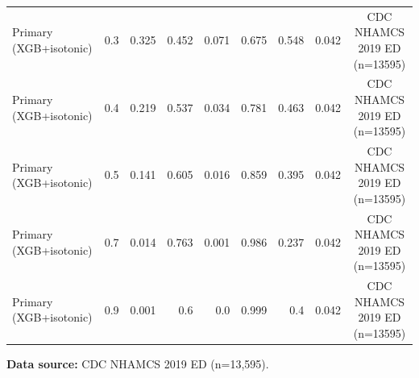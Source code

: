 \begin{table}[t]
\begin{tabular}{lrrrrrrrc}
Primary (XGB+isotonic) & 0.3 & 0.325 & 0.452 & 0.071 & 0.675 & 0.548 & 0.042 & CDC NHAMCS 2019 ED (n=13595) \\
Primary (XGB+isotonic) & 0.4 & 0.219 & 0.537 & 0.034 & 0.781 & 0.463 & 0.042 & CDC NHAMCS 2019 ED (n=13595) \\
Primary (XGB+isotonic) & 0.5 & 0.141 & 0.605 & 0.016 & 0.859 & 0.395 & 0.042 & CDC NHAMCS 2019 ED (n=13595) \\
Primary (XGB+isotonic) & 0.7 & 0.014 & 0.763 & 0.001 & 0.986 & 0.237 & 0.042 & CDC NHAMCS 2019 ED (n=13595) \\
Primary (XGB+isotonic) & 0.9 & 0.001 & 0.6 & 0.0 & 0.999 & 0.4 & 0.042 & CDC NHAMCS 2019 ED (n=13595) \\
\bottomrule
\end{tabular}
\par\vspace{2pt}\raggedright\footnotesize \textbf{Data source:} CDC NHAMCS 2019 ED (n=13,595).
\end{table}

